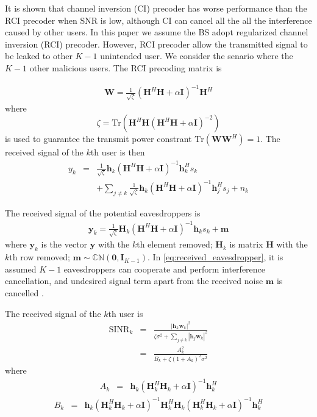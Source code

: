 \documentclass[12pt,journal,draftclsnofoot,onecolumn]{IEEEtran}
\begin{document}
It is shown that channel inversion (CI) precoder has worse performance than the RCI precoder when SNR is low, although CI can cancel all the all the interference caused by other users. In this paper we assume the BS adopt regularized channel inversion (RCI) precoder.  However, RCI precoder allow the transmitted signal to be leaked to other $K-1$ unintended user. We consider the senario where the $K-1$ other malicious users. The RCI precoding matrix is 

\begin{eqnarray}
\mathbf{W} = \frac{1}{\sqrt{\zeta}}\left(\mathbf{H}^H\mathbf{H} + \alpha\mathbf{I}\right)^{-1}\mathbf{H}^H
\end{eqnarray}
where 
\begin{equation} \label{eq:zeta}
\zeta = \mathrm{Tr}\left(\mathbf{H}^H\mathbf{H}\left(\mathbf{H}^H\mathbf{H} + \alpha\mathbf{I}\right)^{-2}\right)
\end{equation}
is used to guarantee the transmit power constrant $\mathrm{Tr}\left(\mathbf{W}\mathbf{W}^H\right) = 1$.
The received signal of the $k$th user is then
\begin{eqnarray}
y_k &=& \frac{1}{\sqrt{\zeta}}\mathbf{h}_k\left(\mathbf{H}^H\mathbf{H} + \alpha\mathbf{I}\right)^{-1}\mathbf{h}_k^Hs_k \nonumber\\
&&+ \sum_{j \neq k}\frac{1}{\sqrt{\zeta}}\mathbf{h}_k\left(\mathbf{H}^H\mathbf{H} + \alpha\mathbf{I}\right)^{-1}\mathbf{h}_j^Hs_j + n_k
\end{eqnarray}

The received signal of the potential eavesdroppers is 
\begin{eqnarray}
\mathbf{y}_k= \frac{1}{\sqrt{\zeta}}\mathbf{H}_k\left(\mathbf{H}^H\mathbf{H} + \alpha\mathbf{I}\right)^{-1}\mathbf{h}_ks_k + \mathbf{m} \label{eq:received_eavesdropper}
\end{eqnarray}
where $\mathbf{y}_k$ is the vector $\mathbf{y}$ with the $k$th element removed; $\mathbf{H}_k$ is matrix $\mathbf{H}$ with the $k$th row removed; $\mathbf{m} \sim \mathbb{C}\mathbb{N}(\mathbf{0},\mathbf{I}_{K-1})$.
In \eqref{eq:received_eavesdropper}, it is assumed $K-1$ eavesdroppers can cooperate and perform interference cancellation, and undesired signal term apart from the received noise $\mathbf{m}$ is cancelled \cite{geraci2012secrecy}.

The received signal of the $k$th user is 
\begin{eqnarray}
\mathrm{SINR}_{k} &=& \frac{|\mathbf{h}_k\mathbf{w}_k|^2}{\zeta\sigma^2 + \sum_{j \neq k} |\mathbf{h}_j\mathbf{w}_k|^2}\\
&=& \frac{A_k^2}{B_k + \zeta(1+A_k)^2\sigma^2}
\end{eqnarray}
where
\begin{eqnarray}
A_k &=& \mathbf{h}_k\left(\mathbf{H}_k^H\mathbf{H}_k + \alpha\mathbf{I}\right)^{-1}\mathbf{h}_k^H
\end{eqnarray}
\begin{eqnarray}
B_k &=& \mathbf{h}_k\left(\mathbf{H}_k^H\mathbf{H}_k + \alpha\mathbf{I}\right)^{-1}\mathbf{H}_k^H\mathbf{H}_k\left(\mathbf{H}_k^H\mathbf{H}_k + \alpha\mathbf{I}\right)^{-1}\mathbf{h}_k^H \label{eq:B_k}
\end{eqnarray}
\end{document}
